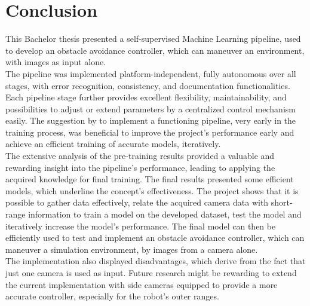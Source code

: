 \section{Conclusion \label{Conclusion} }
This Bachelor thesis presented a self-supervised Machine Learning pipeline, used to develop an obstacle avoidance controller, which can maneuver an environment, with images as input alone.\\

The pipeline was implemented platform-independent, fully autonomous over all stages, with error recognition, consistency, and documentation functionalities. Each pipeline stage further provides excellent flexibility, maintainability, and possibilities to adjust or extend parameters by a centralized control mechanism easily.  The suggestion by \cite{Goodfellow-et-al-2016} to implement a functioning pipeline, very early in the training process, was beneficial to improve the project's performance early and achieve an efficient training of accurate models, iteratively.\\

The extensive analysis of the pre-training results provided a valuable and rewarding insight into the pipeline's performance, leading to applying the acquired knowledge for final training. The final results presented some efficient models, which underline the concept's effectiveness. The project shows that it is possible to gather data effectively, relate the acquired camera data with short-range information to train a model on the developed dataset, test the model and iteratively increase the model's performance. The final model can then be efficiently used to test and implement an obstacle avoidance controller, which can maneuver a simulation environment, by images from a camera alone.\\

The implementation also displayed disadvantages, which derive from the fact that just one camera is used as input. Future research might be rewarding to extend the current implementation with side cameras equipped to provide a more accurate controller, especially for the robot's outer ranges.
